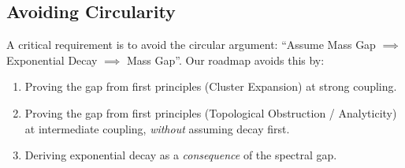 \begin{center}
\end{center}

\subsection{Avoiding Circularity}
A critical requirement is to avoid the circular argument: ``Assume Mass Gap $\implies$ Exponential Decay $\implies$ Mass Gap''.
Our roadmap avoids this by:
\begin{enumerate}
    \item Proving the gap from first principles (Cluster Expansion) at strong coupling.
    \item Proving the gap from first principles (Topological Obstruction / Analyticity) at intermediate coupling, \emph{without} assuming decay first.
    \item Deriving exponential decay as a \emph{consequence} of the spectral gap.
\end{enumerate}


